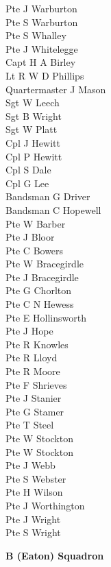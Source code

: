 \begin{multicols}{2}
  Pte J Warburton \\
  Pte S Warburton \\
  Pte S Whalley \\
  Pte J Whitelegge \\
  Capt H A Birley \\
  Lt R W D Phillips \\
  Quartermaster J Mason \\
  Sgt W Leech \\
  Sgt B Wright \\
  Sgt W Platt \\
  Cpl J Hewitt \\
  Cpl P Hewitt \\
  Cpl S Dale \\
  Cpl G Lee \\
  Bandsman G Driver \\
  Bandsman C Hopewell \\
  Pte W Barber \\
  Pte J Bloor \\
  Pte C Bowers \\
  Pte W Bracegirdle \\
  Pte J Bracegirdle \\
  Pte G Chorlton \\
  Pte C N Hewess \\
  Pte E Hollinsworth \\
  Pte J Hope \\
  Pte R Knowles \\
  Pte R Lloyd \\
  Pte R Moore \\
  Pte F Shrieves \\
  Pte J Stanier \\
  Pte G Stamer \\
  Pte T Steel \\
  Pte W Stockton \\
  Pte W Stockton \\
  Pte J Webb \\
  Pte S Webster \\
  Pte H Wilson \\
  Pte J Worthington \\
  Pte J Wright \\
  Pte S Wright \\
\end{multicols}

\begin{center}
  \Large
  \textbf{B (Eaton) Squadron}
\end{center}

